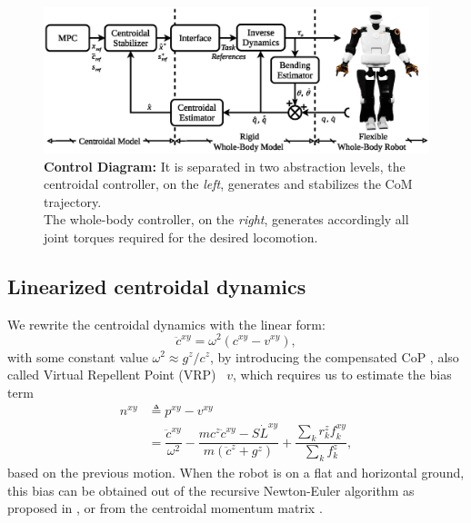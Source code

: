 \documentclass[letterpaper, 10 pt, conference]{ieeeconf}  %
\begin{document}
\begin{figure}[th]
	\centering
	\includegraphics[trim={0 1mm 0 3mm},clip,width=.8\textwidth]{TalosDiagramVectorial.eps}
	\caption{\textbf{Control Diagram:} It is separated in two abstraction levels, the centroidal controller, on the \textit{left}, generates and stabilizes the CoM trajectory. \\\hspace*{33mm}The whole-body controller, on the \textit{right}, generates accordingly all joint torques required for the desired locomotion.} \label{Fig.ControlDiagram}
\end{figure} 

\subsection{Linearized centroidal dynamics}

We rewrite the centroidal dynamics with the linear form:
%
\begin{equation}\label{eq.LinearizedCentroidalDynamics}
\ddot{c}^{xy} = \omega^{2}(c^{xy}-v^{xy}),
\end{equation}
%
with some constant value $\omega^{2}\approx{g^{z}}\!/{c^{z}}$, by introducing the compensated CoP \cite{Villa2019managing}, also called Virtual Repellent Point (VRP)~\cite{Englsberger2015_3D} $v$, which requires us to estimate the bias term 
%
\begin{align}
    n^{xy} &\triangleq p^{xy}-v^{xy} \label{eq.VRP_and_COP} \\ &= \dfrac{\ddot{c}^{xy}}{\omega^{2}}  - \dfrac{mc^{z}{\ddot{c}}^{xy} - {S}{\dot{L}}^{xy}}{m(\ddot{c}^{z}+ g^{z})} + \dfrac{\sum_k r_{k}^{z} f_{k}^{xy}}{\sum_k f_{k}^{z}} , \label{eq.Non-linearEffects}
\end{align}
%
based on the previous motion. When the robot is on a flat and horizontal ground, this bias can be obtained out of the recursive Newton-Euler algorithm as proposed in \cite{naveau:metapod:2014}%
%
, or from the centroidal momentum matrix \cite{Orin2008Centroidal}.
\end{document}

